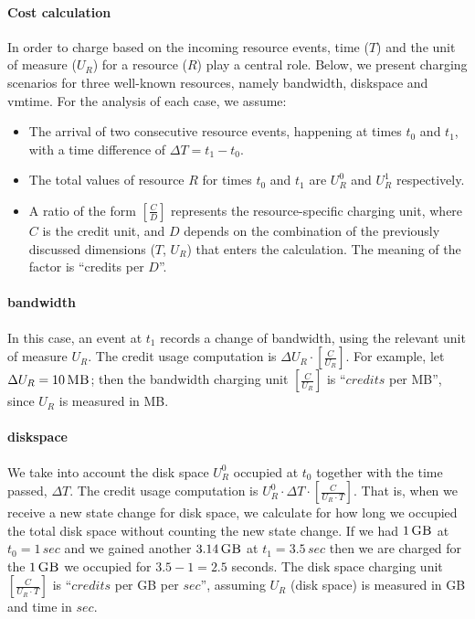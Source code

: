\documentclass[letterpaper,twocolumn,10pt]{article}
\newcommand{\DTime}{\ensuremath{T}\xspace} %
\newcommand{\DUnitR}{\ensuremath{U_{R}}\xspace} %
\newcommand{\MB}[1]{\ensuremath{#1\,\mbox{\sc MB}}}
\newcommand{\GB}[1]{\ensuremath{#1\,\mbox{\sc GB}}}
\newcommand{\secs}[1]{\ensuremath{#1\,sec}}
\begin{document}
\paragraph{Cost calculation}In order to charge based on the incoming
resource events, time (\DTime) and the unit of measure (\DUnitR) for a
resource ($R$) play a central role. Below, we present charging
scenarios for three well-known resources, namely \textsf{bandwidth},
\textsf{diskspace} and \textsf{vmtime}. For the analysis of each case,
we assume:

\begin{itemize}
\item The arrival of two consecutive resource events, happening at
  times $t_0$ and $t_1$, with a time difference of
  $\Delta T = t_1 - t_0$.

\item The total values of resource $R$ for times $t_0$ and $t_1$ are
  $U_R^0$ and $U_R^1$ respectively.

\item A ratio of the form $[\frac{C}{D}]$ represents the
  resource-specific charging unit, where $C$ is the credit unit, and
  $D$ depends on the combination of the previously discussed
  dimensions ($T$, $U_R$) that enters the calculation. The meaning of
  the factor is ``credits per $D$''.
\end{itemize}

\paragraph{\textsf{bandwidth}}
In this case, an event at $t_1$ records a change of bandwidth, using
the relevant unit of measure $U_R$. The credit usage computation is
$\Delta U_R \cdot [ \frac{C}{U_R} ]$. For example, let $\Delta U_R =
\MB{10}$; then the bandwidth charging unit $[ \frac{C}{U_R} ]$ is
``$credits$ per {\sc MB}'', since $U_R$ is measured in {\sc MB}.

\paragraph{\textsf{diskspace}}
We take into account the disk space $U_R^0$ occupied at $t_0$ together
with the time passed, $\Delta T$. The credit usage computation is
$U_R^{0} \cdot \Delta T \cdot [ \frac{C}{U_R \cdot T} ]$. That is,
when we receive a new state change for disk space, we calculate for
how long we occupied the total disk space without counting the new
state change. If we had \GB{1} at $t_0 = \secs{1}$ and we gained
another \GB{3.14} at $t_1 = \secs{3.5}$ then we are charged for the
\GB{1} we occupied for $3.5 - 1 = 2.5$ seconds. The disk space
charging unit $[ \frac{C}{U_R \cdot T} ]$ is ``$credits$ per {\sc GB}
per $sec$'', assuming $U_R$ (disk space) is measured in {\sc GB} and
time in $sec$.
\end{document}
